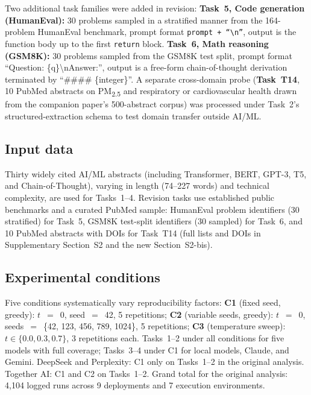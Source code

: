 \documentclass[sn-nature]{sn-jnl}
\begin{document}
Two additional task families were added in revision:
\textbf{Task~5, Code generation (HumanEval):} 30 problems sampled in a stratified manner from the 164-problem HumanEval benchmark\cite{chen2021humaneval}, prompt format \texttt{prompt + ``\textbackslash n''}, output is the function body up to the first \texttt{return} block.
\textbf{Task~6, Math reasoning (GSM8K):} 30 problems sampled from the GSM8K test split\cite{cobbe2021gsm8k}, prompt format ``Question: \{q\}\textbackslash nAnswer:'', output is a free-form chain-of-thought derivation terminated by ``\#\#\#\# \{integer\}''.
A separate cross-domain probe (\textbf{Task~T14}, 10 PubMed abstracts on PM\textsubscript{2.5} and respiratory or cardiovascular health drawn from the companion paper's 500-abstract corpus\cite{rover2026evidence}) was processed under Task~2's structured-extraction schema to test domain transfer outside AI/ML.


\subsection{Input data}\label{subsec:input}

Thirty widely cited AI/ML abstracts (including Transformer, BERT, GPT-3, T5, and Chain-of-Thought\cite{vaswani2017attention,devlin2019bert,brown2020language,raffel2020exploring,wei2022chain}), varying in length (74--227 words) and technical complexity, are used for Tasks~1--4.
Revision tasks use established public benchmarks and a curated PubMed sample:
HumanEval problem identifiers (30 stratified) for Task~5, GSM8K test-split identifiers (30 sampled) for Task~6, and 10 PubMed abstracts with DOIs for Task~T14 (full lists and DOIs in Supplementary Section~S2 and the new Section~S2-bis).


\subsection{Experimental conditions}\label{subsec:conditions}

Five conditions systematically vary reproducibility factors:
\textbf{C1} (fixed seed, greedy): $t$~$=$~0, seed~$=$~42, 5 repetitions;
\textbf{C2} (variable seeds, greedy): $t$~$=$~0, seeds~$=$~\{42, 123, 456, 789, 1024\}, 5 repetitions;
\textbf{C3} (temperature sweep): $t \in \{0.0, 0.3, 0.7\}$, 3 repetitions each.
Tasks~1--2 under all conditions for five models with full coverage; Tasks~3--4 under C1 for local models, Claude, and Gemini.
DeepSeek and Perplexity: C1 only on Tasks~1--2 in the original analysis.
Together AI: C1 and C2 on Tasks~1--2.
Grand total for the original analysis: 4,104 logged runs across 9 deployments and 7 execution environments.
\end{document}
